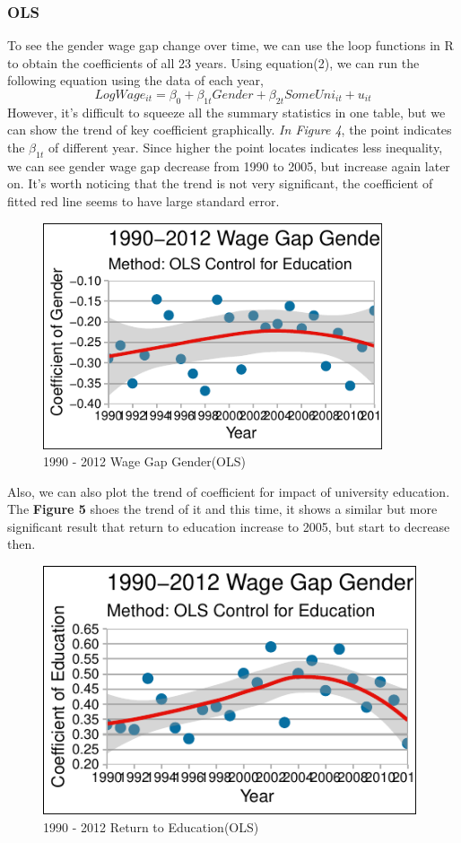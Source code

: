 \documentclass{article}
\begin{document}
\subsubsection{OLS}
To see the gender wage gap change over time, we can use the loop functions in R to obtain the coefficients of all 23 years. Using equation(2), we can run the following equation using the data of each year,
\begin{equation}
    LogWage_{it}=\beta_0+\beta_{1t}Gender+\beta_{2t}SomeUni_{it}+u_{it}
\end{equation}
However, it's difficult to squeeze all the summary statistics in one table, but we can show the trend of key coefficient graphically.
\textit{In Figure 4}, the point indicates the $\beta_{1t}$ of different year. Since higher the point locates indicates less  inequality, we can see gender wage gap decrease from 1990 to 2005,  but increase again later on. It's worth noticing that the trend is not very significant, the coefficient of fitted red line seems to have large standard error.
\begin{figure}[H]
    \centering
    \includegraphics[width=100mm,scale=0.9]{q7p1.pdf}
    \caption{1990 - 2012 Wage Gap Gender(OLS)}
    \label{fig:my_label}
\end{figure}
Also, we can also plot the trend of coefficient for impact of university education. The \textbf{Figure 5 }shoes the trend of it and this time, it shows a similar but more significant result that return to education increase to 2005, but start to decrease then. 
\begin{figure}[H]
    \centering
    \includegraphics[width=110mm,scale=0.9]{q7p2.pdf}
    \caption{1990 - 2012 Return to Education(OLS)}
    \label{fig:my_label}
\end{figure}
\end{document}
